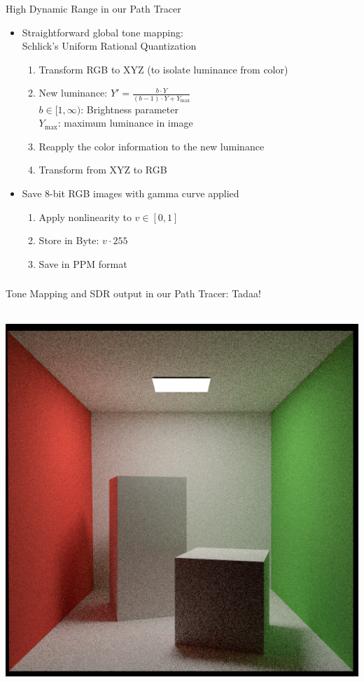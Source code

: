 \documentclass[utf8,stillsansserifmath,fleqn,t]{beamer}
\begin{document}
\begin{frame}[label=tmo-5]
\frametitle{\insertsection}
High Dynamic Range in our Path Tracer
\begin{itemize}
\item Straightforward global tone mapping:\\
Schlick's Uniform Rational Quantization
    \begin{enumerate}
    \item Transform RGB to XYZ (to isolate luminance from color)
    \item New luminance: $Y' = \frac{b \cdot Y}{(b-1)\cdot Y + Y_{\max}}$\\
        $b \in [1,\infty)$: Brightness parameter\\
        $Y_{\max}$: maximum luminance in image
    \item Reapply the color information to the new luminance
    \item Transform from XYZ to RGB
    \end{enumerate}
\item Save 8-bit RGB images with gamma curve applied
    \begin{enumerate}
    \item Apply nonlinearity to $v \in [0,1]$
    \item Store in Byte: $v \cdot 255$
    \item Save in PPM format
    \end{enumerate}
\end{itemize}
\end{frame}

\begin{frame}[label=tmo-6]
\frametitle{\insertsection}
Tone Mapping and SDR output in our Path Tracer: Tadaa!\\~\\
\centerline{\includegraphics[width=.55\textwidth]{./fig/pathtracer-result-05-2.png}}
\end{frame}
\end{document}
